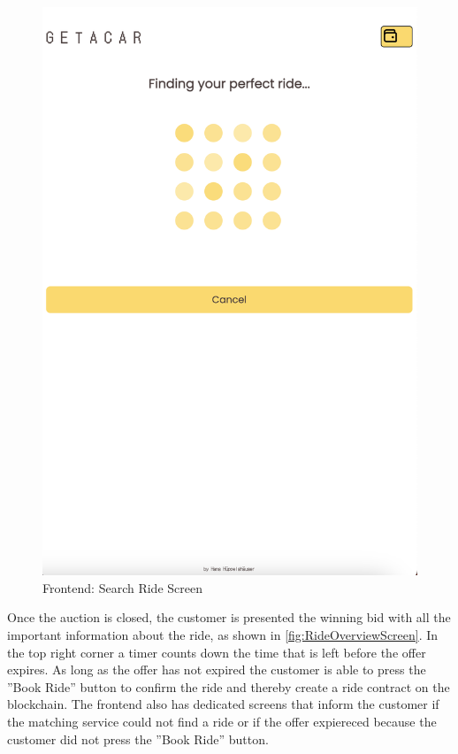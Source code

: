 \begin{figure}[H]
\begin{minipage}{0.45\linewidth}
        \includegraphics[width=\linewidth]{data/ffss/4.png}
        \caption{Frontend: Search Ride Screen}
        \label{fig:SearchRideScreen}
    \end{minipage}
    
\end{figure}

Once the auction is closed, the customer is presented the winning bid with all the important information about the ride, as shown in \ref{fig:RideOverviewScreen}. In the top right corner a timer counts down the time that is left before the offer expires. As long as the offer has not expired the customer is able to press the ''Book Ride'' button to confirm the ride and thereby create a ride contract on the blockchain. The frontend also has dedicated screens that inform the customer if the matching service could not find a ride or if the offer expiereced because the customer did not press the ''Book Ride'' button.

